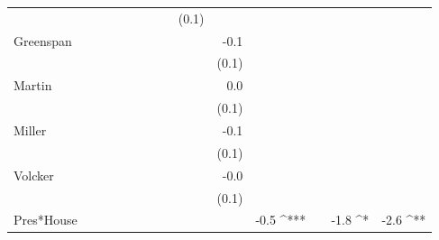 \documentclass[a4paper]{article}\usepackage{graphicx, color}
\begin{document}
\begin{table}[ht]
\begin{center}
{\begin{tabular}{ l D{.}{.}{1}D{.}{.}{1}D{.}{.}{1}D{.}{.}{1}D{.}{.}{1}D{.}{.}{1}D{.}{.}{1}D{.}{.}{1}D{.}{.}{1}D{.}{.}{1}D{.}{.}{1}D{.}{.}{1}D{.}{.}{1} }
                     &                &                &                &                &                &                &                & (0.1)          &                &                &                &                &               \\ 
Greenspan            &                &                &                &                &                &                &                &                & -0.1           &                &                &                &               \\ 
                     &                &                &                &                &                &                &                &                & (0.1)          &                &                &                &               \\ 
Martin               &                &                &                &                &                &                &                &                & 0.0            &                &                &                &               \\ 
                     &                &                &                &                &                &                &                &                & (0.1)          &                &                &                &               \\ 
Miller               &                &                &                &                &                &                &                &                & -0.1           &                &                &                &               \\ 
                     &                &                &                &                &                &                &                &                & (0.1)          &                &                &                &               \\ 
Volcker              &                &                &                &                &                &                &                &                & -0.0           &                &                &                &               \\ 
                     &                &                &                &                &                &                &                &                & (0.1)          &                &                &                &               \\ 
Pres*House           &                &                &                &                &                &                &                &                &                & -0.5 ^{***}    &                & -1.8 ^*        & -2.6 ^{**}    \\ 

\end{tabular}}
\end{center}
\end{table}
\end{document}
